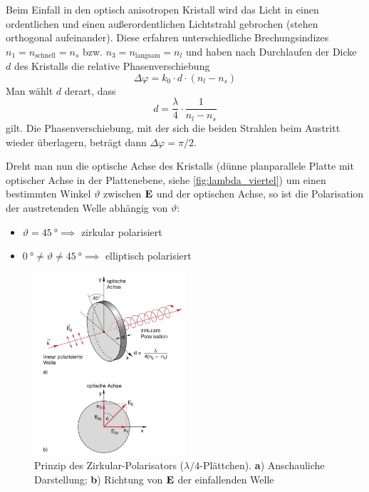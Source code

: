 \documentclass[a4paper, 11pt, ngerman, parskip=half-]{scrartcl}
\begin{document}
Beim Einfall in den optisch anisotropen Kristall wird das Licht in einen ordentlichen und einen außerordentlichen Lichtstrahl gebrochen (stehen orthogonal aufeinander).
Diese erfahren unterschiedliche Brechungsindizes $n_1 = n_{\text{schnell}} = n_s$ bzw. $n_3 = n_{\text{langsam}} = n_l$ und haben nach Durchlaufen der Dicke $d$ des Kristalls die relative Phasenverschiebung
%
\[\Delta \varphi = k_0 \cdot d \cdot (n_l - n_s) \]
%
Man wählt $d$ derart, dass
%
\[d = \frac{\lambda}{4} \cdot \frac{1}{n_l - n_s}\]
%
gilt. Die Phasenverschiebung, mit der sich die beiden Strahlen beim Austritt wieder überlagern, beträgt dann $\Delta \varphi = \pi/2$.

Dreht man nun die optische Achse des Kristalls (dünne planparallele Platte mit optischer Achse in der Plattenebene,
siehe \autoref{fig:lambda_viertel}) um einen bestimmten Winkel $\vartheta$ zwischen $\vb{E}$ und der optischen Achse,
so ist die Polarisation der austretenden Welle abhängig von $\vartheta$:
\begin{itemize}
    \item $\vartheta = \SI{45}{\degree} \implies$ zirkular polarisiert
    \item $\SI{0}{\degree} \neq \vartheta \neq \SI{45}{\degree} \implies$ elliptisch polarisiert
\end{itemize}
%
\begin{figure}[!h]
    \centering
    \begin{samepage}
        \includegraphics[width=0.5\textwidth]{image/15/lambda_viertel.jpg}
        \caption{Prinzip des Zirkular-Polarisators ($\lambda/4$-Plättchen). \textbf{a}) Anschauliche Darstellung; \textbf{b}) Richtung von $\vb{E}$ der einfallenden Welle}
        \label{fig:lambda_viertel}
    \end{samepage}
\end{figure}
%
\end{document}
